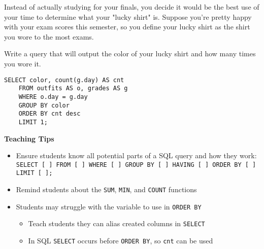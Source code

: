 \begin{blocksection}
\question
Instead of actually studying for your finals, you decide it would be the best use of your time to determine what your "lucky shirt" is. Suppose you're pretty happy with your exam scores this semester, so you define your lucky shirt as the shirt you wore to the most exams.

Write a query that will output the color of your lucky shirt and how many times you wore it.

\begin{solution}[1.5in]
\begin{lstlisting}
SELECT color, count(g.day) AS cnt
    FROM outfits AS o, grades AS g
    WHERE o.day = g.day
    GROUP BY color
    ORDER BY cnt desc
    LIMIT 1;
\end{lstlisting}
\end{solution}
\end{blocksection}

\begin{guide}
\begin{blocksection}
\textbf{Teaching Tips}
\begin{itemize}
  \item Ensure students know all potential parts of a SQL query and how they work:
  \\\lstinline{SELECT [ ] FROM [ ] WHERE [ ] GROUP BY [ ] HAVING [ ] ORDER BY [ ] LIMIT [ ];}
  \item Remind students about the \lstinline{SUM}, \lstinline{MIN}, and \lstinline{COUNT} functions
  \item Students may struggle with the variable to use in \lstinline{ORDER BY}
  \begin{itemize}
    \item Teach students they can alias created columns in \lstinline{SELECT}
    \item In SQL \lstinline{SELECT} occurs before \lstinline{ORDER BY}, so \lstinline{cnt} can be used
  \end{itemize}
\end{itemize}
\end{blocksection}
\end{guide}
